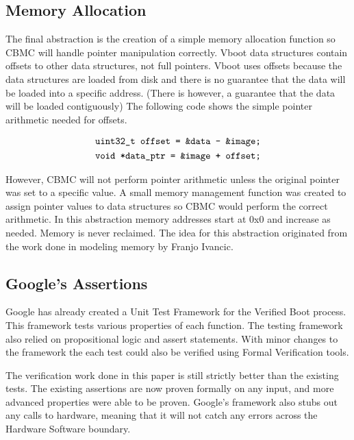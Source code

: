 \subsection{Memory Allocation}

The final abstraction is the creation of a simple memory allocation function so
CBMC will handle pointer manipulation correctly.
Vboot data structures contain offsets to other data structures, not full
pointers. 
Vboot uses offsets because the data structures are loaded from disk and there is
no guarantee that the data will be loaded into a specific address.
(There is however, a guarantee that the data will be loaded contiguously)
The following code shows the simple pointer arithmetic needed for offsets.

\begin{equation} \label{eq:ptr}
\begin{split}
    \texttt{uint32\_t offset = \&data - \&image;} \\
    \texttt{void *data\_ptr = \&image + offset;} 
\end{split}
\end{equation}

However, CBMC will not perform pointer arithmetic unless the original pointer
was set to a specific value.
A small memory management function was created to assign pointer values to data
structures so CBMC would perform the correct arithmetic.
In this abstraction memory addresses start at 0x0 and increase as needed.
Memory is never reclaimed.
The idea for this abstraction originated from the work done in modeling memory
by Franjo Ivancic\cite{eff-model-check}.

\subsection{Google's Assertions}

Google has already created a Unit Test Framework for the Verified Boot process.
This framework tests various properties of each function.
The testing framework also relied on propositional logic and assert statements.
With minor changes to the framework the each test could also be verified using Formal Verification tools.

The verification work done in this paper is still strictly better than the existing tests. 
The existing assertions are now proven formally on any input, and more advanced properties were able to be proven. 
Google's framework also stubs out any calls to hardware, meaning that it 
will not catch any errors across the Hardware Software boundary.

